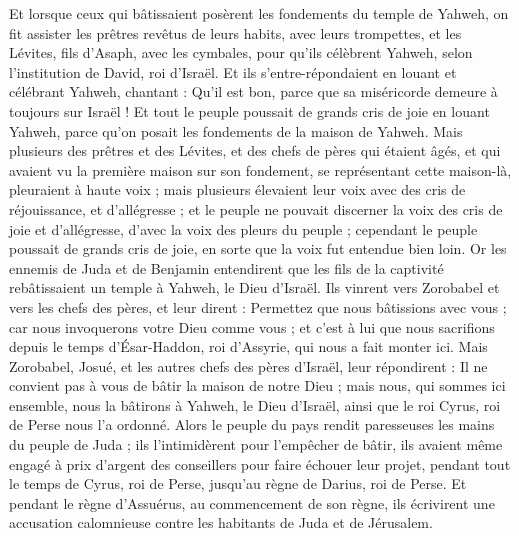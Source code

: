 \begin{multicols}{2}
Et lorsque ceux qui bâtissaient posèrent les fondements du temple de Yahweh, on fit assister les prêtres revêtus de leurs habits, avec leurs trompettes, et les Lévites, fils d'Asaph, avec les cymbales, pour qu'ils célèbrent Yahweh, selon l'institution de David, roi d'Israël.
Et ils s'entre-répondaient en louant et célébrant Yahweh, chantant : Qu'il est bon, parce que sa miséricorde demeure à toujours sur Israël ! Et tout le peuple poussait de grands cris de joie en louant Yahweh, parce qu'on posait les fondements de la maison de Yahweh.
Mais plusieurs des prêtres et des Lévites, et des chefs de pères qui étaient âgés, et qui avaient vu la première maison sur son fondement, se représentant cette maison-là, pleuraient à haute voix ; mais plusieurs élevaient leur voix avec des cris de réjouissance, et d'allégresse ;
et le peuple ne pouvait discerner la voix des cris de joie et d'allégresse, d'avec la voix des pleurs du peuple ; cependant le peuple poussait de grands cris de joie, en sorte que la voix fut entendue bien loin.
\VerseOne{}Or les ennemis de Juda et de Benjamin entendirent que les fils de la captivité rebâtissaient un temple à Yahweh, le Dieu d'Israël.
Ils vinrent vers Zorobabel et vers les chefs des pères, et leur dirent : Permettez que nous bâtissions avec vous ; car nous invoquerons votre Dieu comme vous ; et c'est à lui que nous sacrifions depuis le temps d'Ésar-Haddon, roi d'Assyrie, qui nous a fait monter ici.
Mais Zorobabel, Josué, et les autres chefs des pères d'Israël, leur répondirent : Il ne convient pas à vous de bâtir la maison de notre Dieu ; mais nous, qui sommes ici ensemble, nous la bâtirons à Yahweh, le Dieu d'Israël, ainsi que le roi Cyrus, roi de Perse nous l'a ordonné.
Alors le peuple du pays rendit paresseuses les mains du peuple de Juda ; ils l'intimidèrent pour l'empêcher de bâtir,
ils avaient même engagé à prix d'argent des conseillers pour faire échouer leur projet, pendant tout le temps de Cyrus, roi de Perse, jusqu'au règne de Darius, roi de Perse.
Et pendant le règne d'Assuérus, au commencement de son règne, ils écrivirent une accusation calomnieuse contre les habitants de Juda et de Jérusalem.

\end{multicols}
